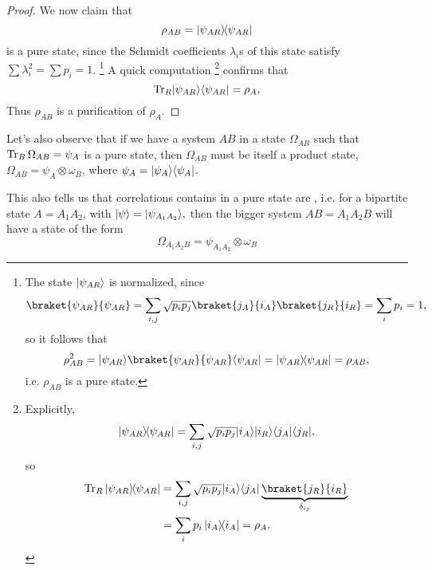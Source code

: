 \begin{proof}
    We now claim that
    \begin{equation}
        \rho_{AB}=\left\lvert{\psi_{AR}}\middle\rangle\!\middle\langle{\psi_{AR}}\right\rvert
    \end{equation}
    is a pure state, since the Schmidt coefficients $\lambda_i$s of this state satisfy $\sum \lambda_i^2 =\sum p_i =1$.%
        \footnote{
            The state $\lvert\psi_{AR}\rangle$ is normalized, since
            \begin{equation*}
                \braket{\psi_{AR}}{\psi_{AR}}=\sum_{i,j}\sqrt{p_i p_j} \braket{j_A}{i_A}\braket{j_R}{i_R} =\sum_i p_i =1,
            \end{equation*}
            so it follows that
            \begin{equation*}
                \rho_{AB}^2= \ket{\psi_{AR}}\braket{\psi_{AR}}{\psi_{AR}}\bra{\psi_{AR}}=\dyad{\psi_{AR}}=\rho_{AB},
            \end{equation*}
            i.e. $\rho_{AB}$ is a pure state.
        }
    A quick computation%
        \footnote{Explicitly,
        \begin{equation*}
            \left\lvert{\psi_{AR}}\middle\rangle\!\middle\langle{\psi_{AR}}\right\rvert=\sum_{i,j} \sqrt{p_i p_j} \lvert i_A\rangle \lvert i_R\rangle \langle j_A\rvert\langle j_R\rvert,
        \end{equation*}
        so
        \begin{align*}
            \Tr_R \dyad{\psi_{AR}} &= \sum_{i,j} \sqrt{p_i p_j} \ket{i_A} \bra{j_A} \underbrace{\braket{j_R}{i_R}}_{\delta_{ij}}\\
                &=\sum_i p_i \dyad{i_A} = \rho_A.
        \end{align*}
        }
    confirms that
    \begin{equation}
        \operatorname{Tr}_R \lvert\psi_{AR}\rangle\langle\psi_{AR}\rvert= \rho_A,
    \end{equation}
    Thus $\rho_{AB}$ is a purification of $\rho_A$.
\end{proof}

Let's also observe that if we have a system $AB$ in a state $\Omega_{AB}$ such that $\operatorname{Tr}_B \Omega_{AB}=\psi_A$ is a pure state, then $\Omega_{AB}$ must be itself a product state, $\Omega_{AB}=\psi_A \otimes \omega_B$, where $\psi_A=\lvert\psi_A\rangle\langle\psi_A\rvert$.

This also tells us that correlations contains in a pure state are , i.e. for a bipartite state $A=A_1 A_2$, with $\lvert\psi\rangle=\lvert\psi_{A_1A_2}\rangle,$ then the bigger system $AB=A_1 A_2 B$ will have a state of the form
\begin{equation}
    \Omega_{A_1A_2B} = \psi_{A_1A_2} \otimes \omega_B
\end{equation}
